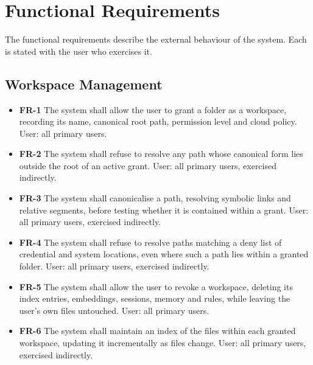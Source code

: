 \documentclass{FastFyp}
\begin{document}
\section{Functional Requirements}
The functional requirements describe the external behaviour of the system. Each is stated with the user who exercises it.

\subsection{Workspace Management}
\begin{itemize}
    \item \textbf{FR-1} The system shall allow the user to grant a folder as a workspace, recording its name, canonical root path, permission level and cloud policy. User: all primary users.
    \item \textbf{FR-2} The system shall refuse to resolve any path whose canonical form lies outside the root of an active grant. User: all primary users, exercised indirectly.
    \item \textbf{FR-3} The system shall canonicalise a path, resolving symbolic links and relative segments, before testing whether it is contained within a grant. User: all primary users, exercised indirectly.
    \item \textbf{FR-4} The system shall refuse to resolve paths matching a deny list of credential and system locations, even where such a path lies within a granted folder. User: all primary users, exercised indirectly.
    \item \textbf{FR-5} The system shall allow the user to revoke a workspace, deleting its index entries, embeddings, sessions, memory and rules, while leaving the user's own files untouched. User: all primary users.
    \item \textbf{FR-6} The system shall maintain an index of the files within each granted workspace, updating it incrementally as files change. User: all primary users, exercised indirectly.
\end{itemize}
\end{document}
